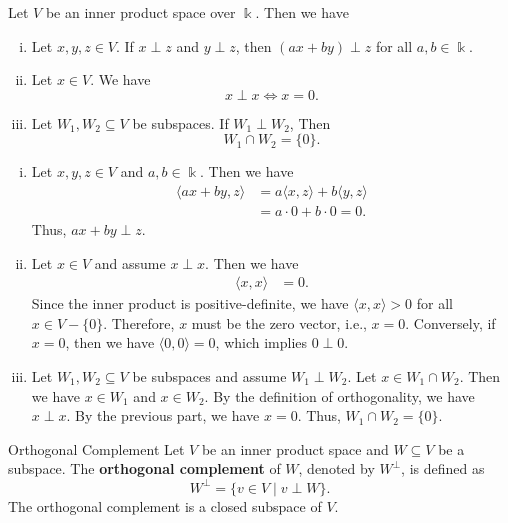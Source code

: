 \begin{proposition}{}{}
    Let $V$ be an inner product space over $\Bbbk$. Then we have 
    \begin{enumerate}[(i)]
        \item Let $x,y,z\in V$. If $x\perp z$ and $y\perp z$, then $(a x+b y)\perp z$ for all $a,b\in \Bbbk$.
        \item Let $x\in V$. We have
        \[
        x \perp x\iff x=0.
        \]
        \item Let $W_1, W_2\subseteq V$ be subspaces. If $W_1\perp W_2$, Then
        \[
        W_1\cap W_2 = \{0\}.    
        \]
    \end{enumerate}
\end{proposition}
\begin{prf}
    \begin{enumerate}[(i)]
        \item Let $x,y,z\in V$ and $a,b\in \Bbbk$. Then we have
        \[            \begin{aligned}
                \langle ax+by, z \rangle &= a\langle x, z \rangle + b\langle y, z \rangle\\
                &= a\cdot 0 + b\cdot 0 = 0.
            \end{aligned}
        \]
        Thus, $ax+by\perp z$.   
        \item Let $x\in V$ and assume $x\perp x$. Then we have
        \[            \begin{aligned}
                \langle x, x \rangle &= 0.
            \end{aligned}           
        \]
        Since the inner product is positive-definite, we have $\langle x, x \rangle > 0$ for all $x\in V-\{0\}$. Therefore, $x$ must be the zero vector, i.e., $x=0$. Conversely, if $x=0$, then we have $\langle 0, 0 \rangle = 0$, which implies $0\perp 0$.
        \item Let $W_1, W_2\subseteq V$ be subspaces and assume $W_1\perp W_2$. Let $x\in W_1\cap W_2$. Then we have $x\in W_1$ and $x\in W_2$. By the definition of orthogonality, we have $x \perp x$. By the previous part, we have $x=0$. Thus, $W_1\cap W_2 = \{0\}$. 
    \end{enumerate}
\end{prf}

\begin{definition}{Orthogonal Complement}{}
    Let $V$ be an inner product space and $W\subseteq V$ be a subspace. The \textbf{orthogonal complement} of $W$, denoted by $W^\perp$, is defined as
    \[
        W^\perp = \{ v\in V \mid v\perp W\}.
    \]
    The orthogonal complement is a closed subspace of $V$.
\end{definition}

